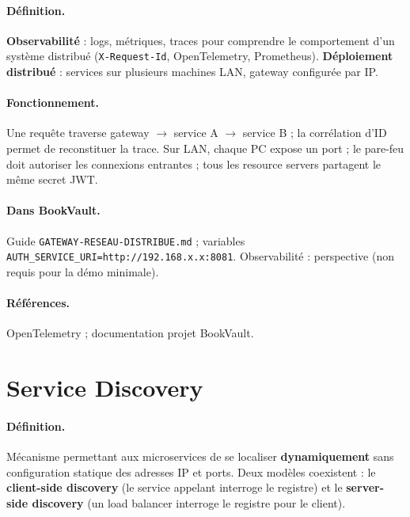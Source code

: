 \documentclass[12pt,a4paper]{report}
\begin{document}
\paragraph{Définition.} \textbf{Observabilité} : logs, métriques, traces pour comprendre le comportement d'un système distribué (\texttt{X-Request-Id}, OpenTelemetry, Prometheus). \textbf{Déploiement distribué} : services sur plusieurs machines LAN, gateway configurée par IP.\par

\paragraph{Fonctionnement.} Une requête traverse gateway $\rightarrow$ service A $\rightarrow$ service B ; la corrélation d'ID permet de reconstituer la trace. Sur LAN, chaque PC expose un port ; le pare-feu doit autoriser les connexions entrantes ; tous les resource servers partagent le même secret JWT.\par

\paragraph{Dans BookVault.} Guide \texttt{GATEWAY-RESEAU-DISTRIBUE.md} ; variables \texttt{AUTH\_SERVICE\_URI=http://192.168.x.x:8081}. Observabilité : perspective (non requis pour la démo minimale).\par

\paragraph{Références.} OpenTelemetry ; documentation projet BookVault.\par



\section{Service Discovery}

\paragraph{Définition.} Mécanisme permettant aux microservices de se localiser \textbf{dynamiquement} sans configuration statique des adresses IP et ports. Deux modèles coexistent : le \textbf{client-side discovery} (le service appelant interroge le registre) et le \textbf{server-side discovery} (un load balancer interroge le registre pour le client).\par
\end{document}
